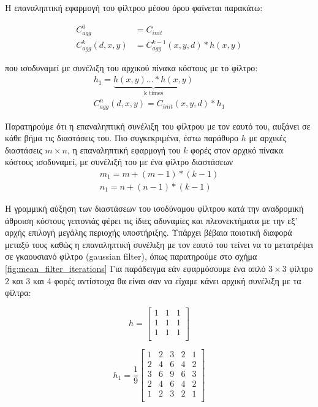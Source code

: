 Η επαναληπτική εφαρμογή του φίλτρου μέσου όρου φαίνεται παρακάτω:

\begin{align*} 
C_{agg}^{0} &= C_{init} \\
C_{agg}^{k}(d,x,y) &= C_{agg}^{k-1}(x,y,d) \ast h(x,y)
\end{align*}

που ισοδυναμεί με συνέλιξη του αρχικού πίνακα κόστους με το φίλτρο: \e
\begin{gather*} 
h_1 = \underbrace{h(x,y) \ldots \ast h(x,y)}_{\text{k times}} \\ 
C_{agg}^{n}(d,x,y) = C_{init}(x,y,d) \ast h_1
\end{gather*}
\g

Παρατηρούμε ότι η επαναληπτική συνέλιξη του φίλτρου με τον εαυτό του, αυξάνει σε κάθε βήμα τις διαστάσεις του. Πιο συγκεκριμένα, έστω παράθυρο $h$ με αρχικές διαστάσεις $m \times n$, η επαναληπτική εφαρμογή του $k$ φορές στον αρχικό πίνακα κόστους ισοδυναμεί, με συνέλιξή του με ένα φίλτρο διαστάσεων
\begin{gather*} 
m_1 = m + (m-1)*(k-1) \\ 
n_1 = n + (n-1)*(k-1)
\end{gather*}

Η γραμμική αύξηση των διαστάσεων του ισοδύναμου φίλτρου κατά την αναδρομική άθροιση κόστους γειτονιάς φέρει τις ίδιες αδυναμίες και πλεονεκτήματα με την εξ' αρχής επιλογή μεγάλης περιοχής υποστήριξης. Υπάρχει βέβαια ποιοτική διαφορά μεταξύ τους καθώς η επαναληπτική συνέλιξη με τον εαυτό του τείνει να το μετατρέψει σε γκαουσιανό φίλτρο \e(gaussian filter)\g, όπως παρατηρούμε στο σχήμα \ref{fig:mean_filter_iterations} Για παράδειγμα εάν εφαρμόσουμε ένα απλό $3 \times 3$ φίλτρο 2 και 3 και 4 φορές αντίστοιχα θα είναι σαν να είχαμε κάνει αρχική συνέλιξη με τα φίλτρα:

\[
h =
\begin{bmatrix}
  1 & 1 & 1\\
  1 & 1 & 1\\
  1 & 1 & 1\\
\end{bmatrix}
\]

\[
h_1 = \dfrac{1}{9} 
\begin{bmatrix}
  1 & 2 & 3 & 2 & 1\\
  2 & 4 & 6 & 4 & 2\\
  3 & 6 & 9 & 6 & 3\\
  2 & 4 & 6 & 4 & 2\\
  1 & 2 & 3 & 2 & 1\\
\end{bmatrix}
\]

